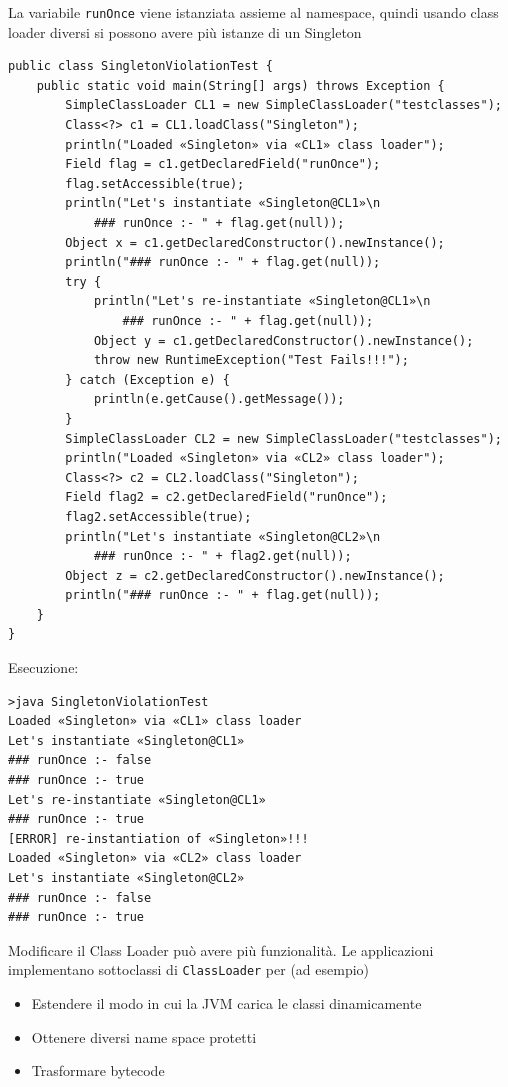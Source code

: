 La variabile \texttt{runOnce} viene istanziata assieme al namespace, quindi usando class loader diversi si possono avere più istanze di un Singleton
\begin{verbatim}
public class SingletonViolationTest {
    public static void main(String[] args) throws Exception {
        SimpleClassLoader CL1 = new SimpleClassLoader("testclasses");
        Class<?> c1 = CL1.loadClass("Singleton");
        println("Loaded «Singleton» via «CL1» class loader");
        Field flag = c1.getDeclaredField("runOnce");
        flag.setAccessible(true);
        println("Let's instantiate «Singleton@CL1»\n
            ### runOnce :- " + flag.get(null));
        Object x = c1.getDeclaredConstructor().newInstance();
        println("### runOnce :- " + flag.get(null));
        try {
            println("Let's re-instantiate «Singleton@CL1»\n
                ### runOnce :- " + flag.get(null));
            Object y = c1.getDeclaredConstructor().newInstance();
            throw new RuntimeException("Test Fails!!!");
        } catch (Exception e) {
            println(e.getCause().getMessage());
        }
        SimpleClassLoader CL2 = new SimpleClassLoader("testclasses");
        println("Loaded «Singleton» via «CL2» class loader");
        Class<?> c2 = CL2.loadClass("Singleton");
        Field flag2 = c2.getDeclaredField("runOnce");
        flag2.setAccessible(true);
        println("Let's instantiate «Singleton@CL2»\n
            ### runOnce :- " + flag2.get(null));
        Object z = c2.getDeclaredConstructor().newInstance();
        println("### runOnce :- " + flag.get(null));
    }
}
\end{verbatim}

Esecuzione:
\begin{verbatim}
>java SingletonViolationTest
Loaded «Singleton» via «CL1» class loader
Let's instantiate «Singleton@CL1»
### runOnce :- false
### runOnce :- true
Let's re-instantiate «Singleton@CL1»
### runOnce :- true
[ERROR] re-instantiation of «Singleton»!!!
Loaded «Singleton» via «CL2» class loader
Let's instantiate «Singleton@CL2»
### runOnce :- false
### runOnce :- true
\end{verbatim}

Modificare il Class Loader può avere più funzionalità. Le applicazioni implementano sottoclassi di \texttt{ClassLoader} per (ad esempio)
\begin{itemize}
    \item Estendere il modo in cui la JVM carica le classi dinamicamente

    \item Ottenere diversi name space protetti

    \item Trasformare bytecode
\end{itemize}

